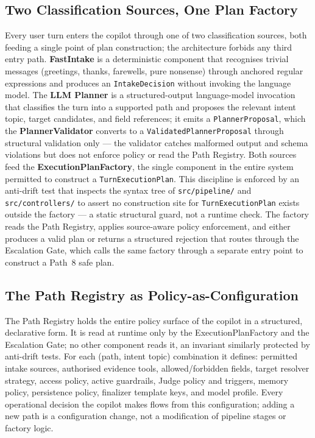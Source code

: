 \subsection{Two Classification Sources, One Plan Factory}
Every user turn enters the copilot through one of two classification sources, both feeding a single point of plan construction; the architecture forbids any third entry path. \textbf{FastIntake} is a deterministic component that recognises trivial messages (greetings, thanks, farewells, pure nonsense) through anchored regular expressions and produces an \texttt{IntakeDecision} without invoking the language model. The \textbf{LLM Planner} is a structured-output language-model invocation that classifies the turn into a supported path and proposes the relevant intent topic, target candidates, and field references; it emits a \texttt{PlannerProposal}, which the \textbf{PlannerValidator} converts to a \texttt{ValidatedPlannerProposal} through structural validation only --- the validator catches malformed output and schema violations but does not enforce policy or read the Path Registry. Both sources feed the \textbf{ExecutionPlanFactory}, the single component in the entire system permitted to construct a \texttt{TurnExecutionPlan}. This discipline is enforced by an anti-drift test that inspects the syntax tree of \texttt{src/pipeline/} and \texttt{src/controllers/} to assert no construction site for \texttt{TurnExecutionPlan} exists outside the factory --- a static structural guard, not a runtime check. The factory reads the Path Registry, applies source-aware policy enforcement, and either produces a valid plan or returns a structured rejection that routes through the Escalation Gate, which calls the same factory through a separate entry point to construct a Path~8 safe plan.

\subsection{The Path Registry as Policy-as-Configuration}
The Path Registry holds the entire policy surface of the copilot in a structured, declarative form. It is read at runtime only by the ExecutionPlanFactory and the Escalation Gate; no other component reads it, an invariant similarly protected by anti-drift tests. For each (path, intent topic) combination it defines: permitted intake sources, authorised evidence tools, allowed/forbidden fields, target resolver strategy, access policy, active guardrails, Judge policy and triggers, memory policy, persistence policy, finalizer template keys, and model profile. Every operational decision the copilot makes flows from this configuration; adding a new path is a configuration change, not a modification of pipeline stages or factory logic.

